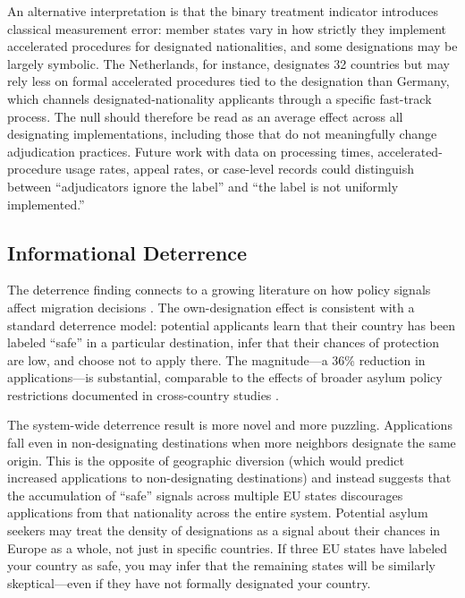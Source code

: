 \documentclass[12pt]{article}
\begin{document}
An alternative interpretation is that the binary treatment indicator introduces classical measurement error: member states vary in how strictly they implement accelerated procedures for designated nationalities, and some designations may be largely symbolic. The Netherlands, for instance, designates 32 countries but may rely less on formal accelerated procedures tied to the designation than Germany, which channels designated-nationality applicants through a specific fast-track process. The null should therefore be read as an average effect across all designating implementations, including those that do not meaningfully change adjudication practices. Future work with data on processing times, accelerated-procedure usage rates, appeal rates, or case-level records could distinguish between ``adjudicators ignore the label'' and ``the label is not uniformly implemented.''

\subsection{Informational Deterrence}

The deterrence finding connects to a growing literature on how policy signals affect migration decisions \citep{czaika2009effectiveness, hatton2004seeking}. The own-designation effect is consistent with a standard deterrence model: potential applicants learn that their country has been labeled ``safe'' in a particular destination, infer that their chances of protection are low, and choose not to apply there. The magnitude---a 36\% reduction in applications---is substantial, comparable to the effects of broader asylum policy restrictions documented in cross-country studies \citep{hatton2009rise}.

The system-wide deterrence result is more novel and more puzzling. Applications fall even in non-designating destinations when more neighbors designate the same origin. This is the opposite of geographic diversion (which would predict increased applications to non-designating destinations) and instead suggests that the accumulation of ``safe'' signals across multiple EU states discourages applications from that nationality across the entire system. Potential asylum seekers may treat the density of designations as a signal about their chances in Europe as a whole, not just in specific countries. If three EU states have labeled your country as safe, you may infer that the remaining states will be similarly skeptical---even if they have not formally designated your country.
\end{document}
